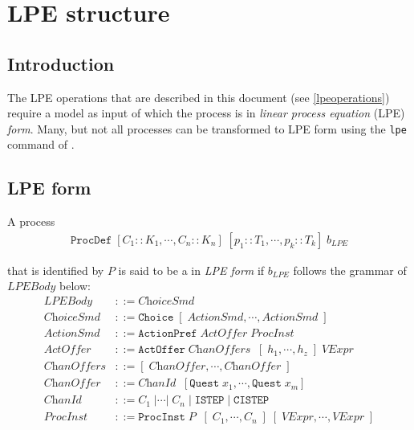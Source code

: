 \chapter{LPE structure}

\section{Introduction}
The LPE operations that are described in this document (see \ref{lpeoperations}) require a \txs{} model as input of which the process is in \emph{linear process equation} (LPE) \emph{form}.
Many, but not all \txs{} processes can be transformed to LPE form using the \texttt{lpe} command of \txs{}.

\section{LPE form} \label{lpeform}

A \txs{} process
\begin{align*}
\texttt{ProcDef} \; [C_1 :: K_1, \cdots{}, C_n :: K_n] \; [p_1 :: T_1, \cdots{}, p_k :: T_k] \; b_\textit{LPE}
\end{align*}

that is identified by $P$ is said to be a in \emph{LPE form} if $b_\textit{LPE}$ follows the grammar of $\textit{LPEBody}$ below:
\begin{align*}
\textit{LPEBody} &::= \textit{ChoiceSmd} \\
\textit{ChoiceSmd} &::= \texttt{Choice} \; [ \;\! \textit{ActionSmd}, \cdots{}, \textit{ActionSmd} \; ] \\
\textit{ActionSmd} &::= \texttt{ActionPref} \; \textit{ActOffer} \; \textit{ProcInst} \\
\textit{ActOffer} &::= \texttt{ActOffer} \; \textit{ChanOffers} \;\; [ \; h_1, \cdots{}, h_z \; ] \; \textit{VExpr} \\
\textit{ChanOffers} &::= [ \;\! \textit{ChanOffer}, \cdots{}, \textit{ChanOffer} \; ] \\
\textit{ChanOffer} &::= \textit{ChanId} \;\; [\texttt{Quest} \; x_1, \cdots{}, \texttt{Quest} \; x_m] \\
\textit{ChanId} &::= C_1 \;| \cdots{} |\; C_n \;|\; \texttt{ISTEP} \;|\; \texttt{CISTEP} \\
\textit{ProcInst} &::= \texttt{ProcInst} \; P \; \; [ \; C_1, \cdots{}, C_n \; ] \; [\;\!\textit{VExpr}, \cdots{}, \textit{VExpr} \; ]
\end{align*}

